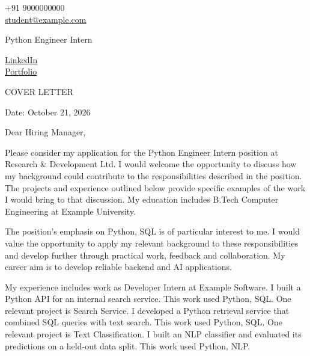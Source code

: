 \documentclass[11pt,a4paper]{article}
\begin{document}
\begin{center}
  \begin{minipage}[b]{0.24\textwidth}
    \raggedright\small +91 9000000000\\ \href{mailto:student@example.com}{student@example.com}
  \end{minipage}%
  \begin{minipage}[b]{0.50\textwidth}
    \par\vspace{0.1cm}
    {\color{UI_blue}\Large Python Engineer Intern}
  \end{minipage}%
  \begin{minipage}[b]{0.24\textwidth}
    \raggedleft\small \href{https://linkedin.com/in/student-example}{LinkedIn}\\ \href{https://student-portfolio.example.com}{Portfolio}
  \end{minipage}
  \par\vspace{0.15cm}{\color{UI_blue}\hrulefill}
\end{center}
\setlength{\parindent}{0pt}
\setlength{\parskip}{12pt}
\begin{center}{\color{UI_blue}\Large COVER LETTER}\end{center}
Date: October 21, 2026\par
Dear Hiring Manager,\par
Please consider my application for the Python Engineer Intern position at Research \& Development Ltd. I would welcome the opportunity to discuss how my background could contribute to the responsibilities described in the position. The projects and experience outlined below provide specific examples of the work I would bring to that discussion. My education includes B.Tech Computer Engineering at Example University.\par
The position’s emphasis on Python, SQL is of particular interest to me. I would value the opportunity to apply my relevant background to these responsibilities and develop further through practical work, feedback and collaboration. My career aim is to develop reliable backend and AI applications.\par
My experience includes work as Developer Intern at Example Software. I built a Python API for an internal search service. This work used Python, SQL. One relevant project is Search Service. I developed a Python retrieval service that combined SQL queries with text search. This work used Python, SQL. One relevant project is Text Classification. I built an NLP classifier and evaluated its predictions on a held-out data split. This work used Python, NLP.\par
\end{document}
